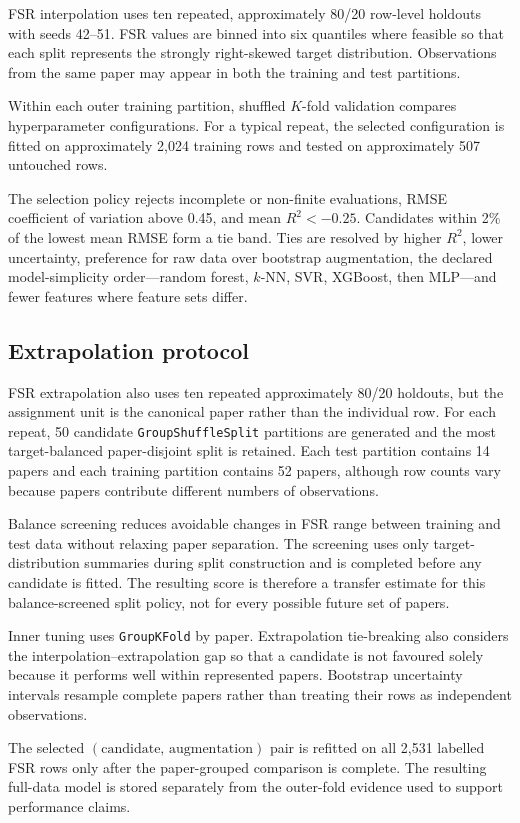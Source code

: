 FSR interpolation uses ten repeated, approximately 80/20 row-level holdouts
with seeds 42--51. FSR values are binned into six quantiles where feasible so
that each split represents the strongly right-skewed target distribution.
Observations from the same paper may appear in both the training and test
partitions.

Within each outer training partition, shuffled \(K\)-fold validation compares
hyperparameter configurations. For a typical repeat, the selected
configuration is fitted on approximately 2,024 training rows and tested on
approximately 507 untouched rows.

The selection policy rejects incomplete or non-finite evaluations, RMSE
coefficient of variation above 0.45, and mean \(R^2<-0.25\). Candidates within
2\% of the lowest mean RMSE form a tie band. Ties are resolved by higher
\(R^2\), lower uncertainty, preference for raw data over bootstrap augmentation,
the declared model-simplicity order---random forest, \(k\)-NN, SVR, XGBoost,
then MLP---and fewer features where feature sets differ.

\subsection{Extrapolation protocol}

FSR extrapolation also uses ten repeated approximately 80/20 holdouts, but the
assignment unit is the canonical paper rather than the individual row. For each
repeat, 50 candidate \texttt{GroupShuffleSplit} partitions are generated and
the most target-balanced paper-disjoint split is retained. Each test partition
contains 14 papers and each training partition contains 52 papers, although row
counts vary because papers contribute different numbers of observations.

Balance screening reduces avoidable changes in FSR range between training and
test data without relaxing paper separation. The screening uses only
target-distribution summaries during split construction and is completed before
any candidate is fitted. The resulting score is therefore a transfer estimate
for this balance-screened split policy, not for every possible future set of
papers.

Inner tuning uses \texttt{GroupKFold} by paper. Extrapolation tie-breaking also
considers the interpolation--extrapolation gap so that a candidate is not
favoured solely because it performs well within represented papers. Bootstrap
uncertainty intervals resample complete papers rather than treating their rows
as independent observations.

The selected
\((\mathrm{candidate},\,\mathrm{augmentation})\) pair is refitted on all
2,531 labelled FSR rows only after the paper-grouped comparison is complete.
The resulting full-data model is stored separately from the outer-fold evidence
used to support performance claims.